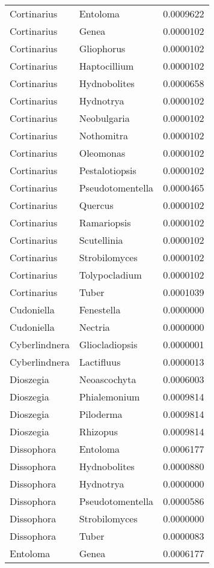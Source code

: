 \documentclass[border=1mm]{standalone}
\begin{document}
\begin{longtable}[t]{lll}
Cortinarius & Entoloma & 0.0009622\\
Cortinarius & Genea & 0.0000102\\
\addlinespace
Cortinarius & Gliophorus & 0.0000102\\
Cortinarius & Haptocillium & 0.0000102\\
Cortinarius & Hydnobolites & 0.0000658\\
Cortinarius & Hydnotrya & 0.0000102\\
Cortinarius & Neobulgaria & 0.0000102\\
\addlinespace
Cortinarius & Nothomitra & 0.0000102\\
Cortinarius & Oleomonas & 0.0000102\\
Cortinarius & Pestalotiopsis & 0.0000102\\
Cortinarius & Pseudotomentella & 0.0000465\\
Cortinarius & Quercus & 0.0000102\\
\addlinespace
Cortinarius & Ramariopsis & 0.0000102\\
Cortinarius & Scutellinia & 0.0000102\\
Cortinarius & Strobilomyces & 0.0000102\\
Cortinarius & Tolypocladium & 0.0000102\\
Cortinarius & Tuber & 0.0001039\\
\addlinespace
Cudoniella & Fenestella & 0.0000000\\
Cudoniella & Nectria & 0.0000000\\
Cyberlindnera & Gliocladiopsis & 0.0000001\\
Cyberlindnera & Lactifluus & 0.0000013\\
Dioszegia & Neoascochyta & 0.0006003\\
\addlinespace
Dioszegia & Phialemonium & 0.0009814\\
Dioszegia & Piloderma & 0.0009814\\
Dioszegia & Rhizopus & 0.0009814\\
Dissophora & Entoloma & 0.0006177\\
Dissophora & Hydnobolites & 0.0000880\\
\addlinespace
Dissophora & Hydnotrya & 0.0000000\\
Dissophora & Pseudotomentella & 0.0000586\\
Dissophora & Strobilomyces & 0.0000000\\
Dissophora & Tuber & 0.0000083\\
Entoloma & Genea & 0.0006177\\

\end{longtable}
\end{document}
